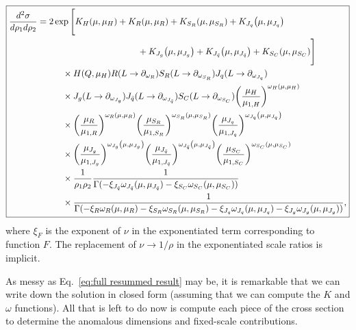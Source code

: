\documentclass[12pt,twoside,class=../reedthesis, crop=false]{standalone}
\begin{document}
	\begin{equation}\label{eq:full resummed result}
	\boxed{
	\begin{aligned}
		\frac{d^2\sigma}{d\rho_1 d\rho_2} &= 2 \exp\Bigg[K_H(\mu, \mu_H)  + K_R(\mu, \mu_R) + K_{S_R}(\mu, \mu_{S_R}) + K_{J_q}\qty(\mu, \mu_{J_q})  \\
		&\hspace{4cm}+ K_{J_g}\qty(\mu, \mu_{J_g}) + K_{J_{\bar q}}\qty(\mu, \mu_{J_{\bar q}}) + K_{S_C}(\mu, \mu_{S_C})  \Bigg] \\
		&\hspace{1cm}\times H(Q, \mu_H) R(L \to \partial_{\omega_R}) S_R(L \to \partial_{\omega_{S_R}}) J_q(L \to \partial_{\omega_{J_q}}) \\
		&\hspace{1cm}\times J_g(L \to \partial_{\omega_{J_g}}) J_{\bar q}(L \to \partial_{\omega_{J_{\bar q}}}) S_C(L \to \partial_{\omega_{S_C}}) \qty(\frac{\mu_H}{\mu_{1, H}})^{\omega_H(\mu, \mu_H)} \\
		&\hspace{1cm}\times  \qty(\frac{\mu_R}{\mu_{1, R}})^{\omega_R(\mu, \mu_R)} \qty(\frac{\mu_{S_R}}{\mu_{1, {S_R}}})^{\omega_{S_R}(\mu, \mu_{S_R})} \qty(\frac{\mu_{J_q}}{\mu_{1, J_q}})^{\omega_{J_q}\qty(\mu, \mu_{J_q})} \\
		&\hspace{1cm}\times \qty(\frac{\mu_{J_g}}{\mu_{1, J_g}})^{\omega_{J_g}\qty(\mu, \mu_{J_g})} \qty(\frac{\mu_{J_{\bar q}}}{\mu_{1, J_{\bar q}}})^{\omega_{J_{\bar q}}\qty(\mu, \mu_{J_{\bar q}})} \qty(\frac{\mu_{S_C}}{\mu_{1, S_C}})^{\omega_{S_C}(\mu, \mu_{S_C})} \\
		&\hspace{1cm}\times \frac{1}{\rho_1 \rho_2} \frac{1}{\Gamma(-\xi_{J_{\bar q}} \omega_{J_{\bar q}}(\mu, \mu_{J_{\bar q}}) - \xi_{S_C} \omega_{S_C}(\mu, \mu_{S_C}))}   \\
		&\hspace{1cm}\times \frac{1}{\Gamma(-\xi_R \omega_R(\mu, \mu_R) - \xi_{S_R} \omega_{S_R}(\mu, \mu_{S_R}) - \xi_{J_q} \omega_{J_q}(\mu, \mu_{J_q}) - \xi_{J_g} \omega_{J_g}(\mu, \mu_{J_g}))},
	\end{aligned}
	}
	\end{equation}
	where $\xi_F$ is the exponent of $\nu$ in the exponentiated term corresponding to function $F$. The replacement of $\nu \to 1/\rho$ in the exponentiated scale ratios is implicit.
	
	As messy as Eq.~\ref{eq:full resummed result} may be, it is remarkable that we can write down the solution in closed form (assuming that we can compute the $K$ and $\omega$ functions). All that is left to do now is compute each piece of the cross section to determine the anomalous dimensions and fixed-scale contributions.
\end{document}
